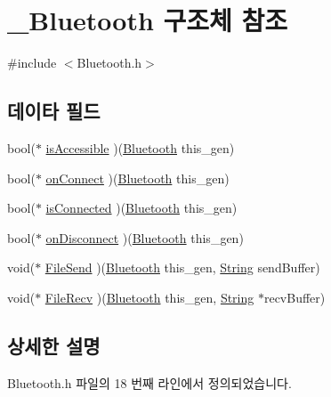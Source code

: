 \hypertarget{struct___bluetooth}{\section{\-\_\-\-Bluetooth 구조체 참조}
\label{struct___bluetooth}
}


{\ttfamily \#include $<$Bluetooth.\-h$>$}

\subsection*{데이타 필드}
\begin{DoxyCompactItemize}
\item 
bool($\ast$ \hyperlink{struct___bluetooth_a4d17357ef3f36198ec75747159ba463e}{is\-Accessible} )(\hyperlink{_bluetooth_8h_aedee4f5eb0a22e2858979432e7f9825e}{Bluetooth} this\-\_\-gen)
\item 
bool($\ast$ \hyperlink{struct___bluetooth_a02ed8ce853ef7914c2d0663ddc85bf71}{on\-Connect} )(\hyperlink{_bluetooth_8h_aedee4f5eb0a22e2858979432e7f9825e}{Bluetooth} this\-\_\-gen)
\item 
bool($\ast$ \hyperlink{struct___bluetooth_afaf7348f13265482f31f6bb326de23d3}{is\-Connected} )(\hyperlink{_bluetooth_8h_aedee4f5eb0a22e2858979432e7f9825e}{Bluetooth} this\-\_\-gen)
\item 
bool($\ast$ \hyperlink{struct___bluetooth_a73fc8eb303afc5b6d5e9188e623f8d3d}{on\-Disconnect} )(\hyperlink{_bluetooth_8h_aedee4f5eb0a22e2858979432e7f9825e}{Bluetooth} this\-\_\-gen)
\item 
void($\ast$ \hyperlink{struct___bluetooth_aa113a2cd73c6888e3a7d4694c6d626e5}{File\-Send} )(\hyperlink{_bluetooth_8h_aedee4f5eb0a22e2858979432e7f9825e}{Bluetooth} this\-\_\-gen, \hyperlink{dit_8h_a2efe6d463d80744789f228f5dc4baa39}{String} send\-Buffer)
\item 
void($\ast$ \hyperlink{struct___bluetooth_a7c339952703ec4aa063f9db4a8561b85}{File\-Recv} )(\hyperlink{_bluetooth_8h_aedee4f5eb0a22e2858979432e7f9825e}{Bluetooth} this\-\_\-gen, \hyperlink{dit_8h_a2efe6d463d80744789f228f5dc4baa39}{String} $\ast$recv\-Buffer)
\end{DoxyCompactItemize}


\subsection{상세한 설명}


Bluetooth.\-h 파일의 18 번째 라인에서 정의되었습니다.




